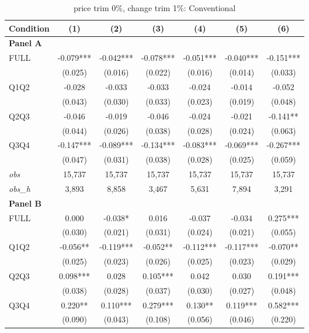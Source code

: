 \documentclass[10pt]{article}
\begin{document}
\begin{table}[!htbp]
\centering
\caption{price trim 0\%, change trim 1\%: Conventional}
\label{tab:abc:trim01:conventional}
\small
\begin{tabular}{lcccccc}
\toprule
Condition & (1) & (2) & (3) & (4) & (5) & (6) \\
\midrule
\textbf{Panel A} &&&&&&  \\

FULL & -0.079*** & -0.042*** & -0.078*** & -0.051*** & -0.040*** & -0.151*** \\
 & (0.025) & (0.016) & (0.022) & (0.016) & (0.014) & (0.033) \\
Q1Q2 & -0.028 & -0.033 & -0.033 & -0.024 & -0.014 & -0.052 \\
 & (0.043) & (0.030) & (0.033) & (0.023) & (0.019) & (0.048) \\
Q2Q3 & -0.046 & -0.019 & -0.046 & -0.024 & -0.021 & -0.141** \\
 & (0.044) & (0.026) & (0.038) & (0.028) & (0.024) & (0.063) \\
Q3Q4 & -0.147*** & -0.089*** & -0.134*** & -0.083*** & -0.069*** & -0.267*** \\
 & (0.047) & (0.031) & (0.038) & (0.028) & (0.025) & (0.059) \\

\textit{obs} & 15,737 & 15,737 & 15,737 & 15,737 & 15,737 & 15,737 \\
\textit{obs\_h} & 3,893 & 8,858 & 3,467 & 5,631 & 7,894 & 3,291 \\

\textbf{Panel B} &&&&&&  \\

FULL & 0.000 & -0.038* & 0.016 & -0.037 & -0.034 & 0.275*** \\
 & (0.030) & (0.021) & (0.031) & (0.024) & (0.021) & (0.055) \\
Q1Q2 & -0.056** & -0.119*** & -0.052** & -0.112*** & -0.117*** & -0.070** \\
 & (0.025) & (0.023) & (0.026) & (0.025) & (0.023) & (0.029) \\
Q2Q3 & 0.098*** & 0.028 & 0.105*** & 0.042 & 0.030 & 0.191*** \\
 & (0.038) & (0.028) & (0.037) & (0.030) & (0.027) & (0.048) \\
Q3Q4 & 0.220** & 0.110*** & 0.279*** & 0.130** & 0.119*** & 0.582*** \\
 & (0.090) & (0.043) & (0.108) & (0.056) & (0.046) & (0.220) \\


\end{tabular}
\end{table}
\end{document}
